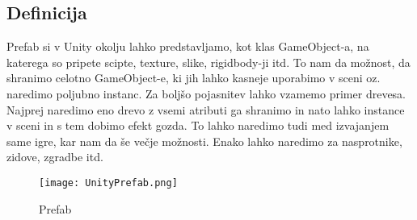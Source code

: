 {\color{indiagreen}\subsection{Definicija}}
Prefab si v Unity okolju lahko predstavljamo, kot klas GameObject-a, na katerega so pripete scipte, texture, slike, rigidbody-ji itd. To nam da možnost, da shranimo celotno GameObject-e, ki jih lahko kasneje uporabimo v sceni oz. naredimo poljubno instanc. Za boljšo pojasnitev lahko vzamemo primer drevesa. Najprej naredimo eno drevo z vsemi atributi ga shranimo in nato lahko instance v sceni in s tem dobimo efekt gozda. To lahko naredimo tudi med izvajanjem same igre, kar nam da še večje možnosti. Enako lahko naredimo za nasprotnike, zidove, zgradbe itd.
\begin{figure}[ht!]
	\centering
	\texttt{[image: UnityPrefab.png]}
	\caption{Prefab}
\end{figure}